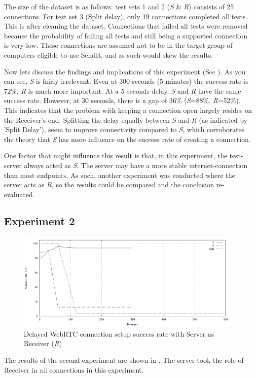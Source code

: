 The size of the dataset is as follows: test sets 1 and 2 (\textit{S} \& \textit{R}) consists of 25 connections. For test set 3 (Split delay), only 19 connections completed all tests. This is after cleaning the dataset. Connections that failed all tests were removed because the probability of failing all tests and still being a supported connection is very low. These connections are assumed not to be in the target group of computers eligible to use SendIt, and as such would skew the results.

Now lets discuss the findings and implications of this experiment (See ). As you can see, \textit{S} is fairly irrelevant. Even at 300 seconds (5 minutes) the success rate is 72\%. \textit{R} is much more important. At a 5 seconds delay, \textit{S} and \textit{R} have the same success rate. However, at 30 seconds, there is a gap of 36\% (\textit{S}=88\%, \textit{R}=52\%). This indicates that the problem with keeping a connection open largely resides on the Receiver's end. Splitting the delay equally between \textit{S} and \textit{R} (as indicated by 'Split Delay'), seem to improve connectivity compared to \textit{S}, which corroborates the theory that \textit{S} has more influence on the success rate of creating a connection.

One factor that might influence this result is that, in this experiment, the test-server always acted as \textit{S}. The server may have a more stable internet-connection than most endpoints. As such, another experiment was conducted where the server acts as \textit{R}, so the results could be compared and the conclusion re-evaluated.
%
%
\subsection{Experiment 2}
%
\begin{figure}[th]
  \centering
  \includegraphics[width=\textwidth]{Figures/Exp2_res}
  \decoRule
  \caption[Results Experiment 2]{Delayed WebRTC connection setup success rate with Server as Receiver (\textit{R})}
  \label{fig:exp2}
\end{figure}
%
The results of the second experiment are shown in . The server took the role of Receiver in all connections in this experiment.

